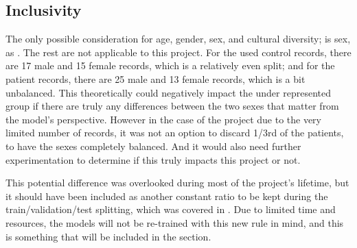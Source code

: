 \subsection{Inclusivity}
\label{sec:inclusive}

The only possible consideration for age, gender, sex, and cultural diversity; is sex, as . The rest are not applicable to this project. For the used control records, there are 17 male and 15 female records, which is a relatively even split; and for the patient records, there are 25 male and 13 female records, which is a bit unbalanced. This theoretically could negatively impact the under represented group if there are truly any differences between the two sexes that matter from the model's perspective. However in the case of the project due to the very limited number of records, it was not an option to discard 1/3rd of the patients, to have the sexes completely balanced. And it would also need further experimentation to determine if this truly impacts this project or not.\par
This potential difference was overlooked during most of the project's lifetime, but it should have been included as another constant ratio to be kept during the train/validation/test splitting, which was covered in . Due to limited time and resources, the models will not be re-trained with this new rule in mind, and this is something that will be included in the   section.









